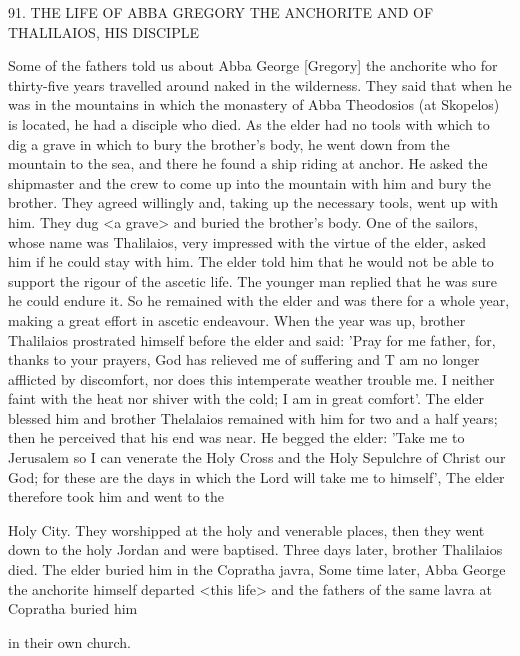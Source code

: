 91.
THE LIFE OF ABBA GREGORY THE ANCHORITE
AND OF THALILAIOS, HIS DISCIPLE

Some of the fathers told us about Abba George [Gregory] the
anchorite who for thirty-five years travelled around naked in the
wilderness.
They said that when he was in the mountains in which
the monastery of Abba Theodosios (at Skopelos) is located, he had
a disciple who died.
As the elder had no tools with which to dig a
grave in which to bury the brother's body, he went down from the
mountain to the sea, and there he found a ship riding at anchor.
He
asked the shipmaster and the crew to come up into the mountain
with him and bury the brother.
They agreed willingly and, taking up
the necessary tools, went up with him.
They dug <a grave> and
buried the brother's body.
One of the sailors, whose name was
Thalilaios, very impressed with the virtue of the elder, asked him if
he could stay with him.
The elder told him that he would not be
able to support the rigour of the ascetic life.
The younger man
replied that he was sure he could endure it.
So he remained with the
elder and was there for a whole year, making a great effort in
ascetic endeavour.
When the year was up, brother Thalilaios
prostrated himself before the elder and said: 'Pray for me father,
for, thanks to your prayers, God has relieved me of suffering and
T am no longer afflicted by discomfort, nor does this intemperate
weather trouble me.
I neither faint with the heat nor shiver with the
cold; I am in great comfort'.
The elder blessed him and brother
Thelalaios remained with him for two and a half years; then he
perceived that his end was near.
He begged the elder: 'Take me to
Jerusalem so I can venerate the Holy Cross and the Holy Sepulchre
of Christ our God; for these are the days in which the Lord will
take me to himself', The elder therefore took him and went to the

Holy City.
They worshipped at the holy and venerable places, then
they went down to the holy Jordan and were baptised.
Three days
later, brother Thalilaios died.
The elder buried him in the Copratha
javra, Some time later, Abba George the anchorite himself departed
<this life> and the fathers of the same lavra at Copratha buried him

in their own church.

